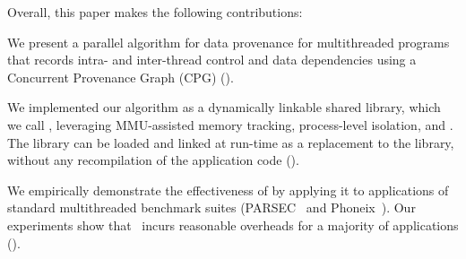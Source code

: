 Overall, this paper makes the following contributions:


We present a parallel algorithm for data provenance for multithreaded programs that records intra- and inter-thread control and data dependencies using a Concurrent Provenance Graph (CPG) ().

We implemented our algorithm as a dynamically linkable shared library, which we call \projecttitle, leveraging MMU-assisted memory tracking, process-level isolation, and \intelpt.  The \projecttitle library can be loaded and linked at run-time as a replacement to the \pthreads library, without any recompilation  of the application code ().

We  empirically demonstrate  the effectiveness of \projecttitle by applying it to applications of standard multithreaded benchmark suites (PARSEC~\cite{parsec} and Phoneix~\cite{phoenix}). Our experiments show that \projecttitle~incurs reasonable overheads for a majority of applications (). 


